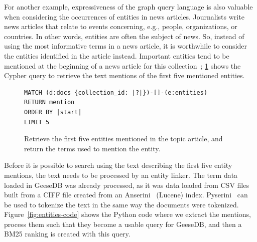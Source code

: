 For another example, expressiveness of the graph query language is also valuable when considering the occurrences of entities in news articles. Journalists write news articles that relate to events concerning, e.g., people, organizations, or countries. In other words, entities are often the subject of news. So, instead of using the most informative terms in a news article, it is worthwhile to consider the entities identified in the article instead. Important entities tend to be mentioned at the beginning of a news article for this collection~\citep{trec-2019}; \cref{fig:entity-cypher} shows the Cypher query to retrieve the text mentions of the first five mentioned entities.

\begin{figure}
	\begin{verbatim}
MATCH (d:docs {collection_id: |?|})-[]-(e:entities)
RETURN mention
ORDER BY |start|
LIMIT 5
	\end{verbatim}
	\caption{Retrieve the first five entities mentioned in the topic article, and return the terms used to mention the entity.}
	\label{fig:entity-cypher}
\end{figure}
\noindent Before it is possible to search using the text describing the first five entity mentions, the text needs to be processed by an entity linker. The term data loaded in GeeseDB was already processed, as it was data loaded from CSV files built from a CIFF file created from an Anserini~\citep{anserini} (Lucene) index. Pyserini~\citep{pyserini} can be used to tokenize the text in the same way the documents were tokenized. Figure~\ref{fig:entities-code} shows the Python code where we extract the mentions, process them such that they become a usable query for GeeseDB, and then a BM25 ranking is created with this query.

